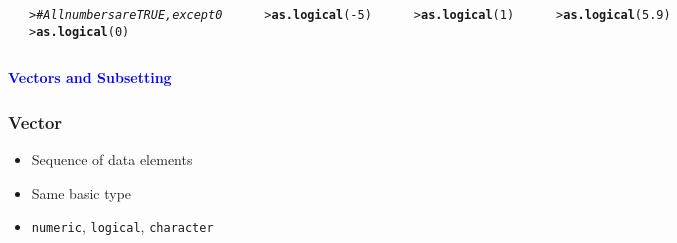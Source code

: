 \documentclass[13pt,aspectratio=169]{beamer}\usepackage[]{graphicx}\usepackage[]{color}
\makeatletter
\newcommand{\hlnum}[1]{\textcolor[rgb]{0.686,0.059,0.569}{#1}}%
\newcommand{\hlcom}[1]{\textcolor[rgb]{0.678,0.584,0.686}{\textit{#1}}}%
\newcommand{\hlopt}[1]{\textcolor[rgb]{0,0,0}{#1}}%
\newcommand{\hlstd}[1]{\textcolor[rgb]{0.345,0.345,0.345}{#1}}%
\newcommand{\hlkwd}[1]{\textcolor[rgb]{0.737,0.353,0.396}{\textbf{#1}}}%
\newenvironment{kframe}{%
 \def\at@end@of@kframe{}%
 \ifinner\ifhmode%
  \def\at@end@of@kframe{\end{minipage}}%
  \begin{minipage}{\columnwidth}%
 \fi\fi%
 \def\FrameCommand##1{\hskip\@totalleftmargin \hskip-\fboxsep
 \colorbox{shadecolor}{##1}\hskip-\fboxsep
     \hskip-\linewidth \hskip-\@totalleftmargin \hskip\columnwidth}%
 \MakeFramed {\advance\hsize-\width
   \@totalleftmargin\z@ \linewidth\hsize
   \@setminipage}}%
 {\par\unskip\endMakeFramed%
 \at@end@of@kframe}
\newenvironment{knitrout}{}{} %
\newcommand{\tc}[2]{\textcolor{#1}{#2}}
\renewcommand{\tt}[1]{\texttt{#1}}
\renewenvironment{knitrout}{\setlength{\topsep}{0mm}}{}
\makeatother
\begin{document}
\begin{frame}[fragile]
\begin{columns}[t]
\begin{knitrout}
\begin{kframe}
{\ttfamily\noindent\color{warningcolor}{Warning: NAs introduced by coercion}}\begin{verbatim}
[1] NA
\end{verbatim}
\end{kframe}
\end{knitrout}
\begin{knitrout}\small
{}\color{fgcolor}\begin{kframe}
\begin{alltt}
\hlstd{> }\hlcom{# All numbers are TRUE, except 0}
\hlstd{> }\hlkwd{as.logical}\hlstd{(}\hlnum{0}\hlstd{)}
\end{alltt}
\begin{verbatim}
[1] FALSE
\end{verbatim}
\begin{alltt}
\hlstd{> }\hlkwd{as.logical}\hlstd{(}\hlopt{-}\hlnum{5}\hlstd{)}
\end{alltt}
\begin{verbatim}
[1] TRUE
\end{verbatim}
\begin{alltt}
\hlstd{> }\hlkwd{as.logical}\hlstd{(}\hlnum{1}\hlstd{)}
\end{alltt}
\begin{verbatim}
[1] TRUE
\end{verbatim}
\begin{alltt}
\hlstd{> }\hlkwd{as.logical}\hlstd{(}\hlnum{5.9}\hlstd{)}
\end{alltt}
\begin{verbatim}
[1] TRUE
\end{verbatim}
\end{kframe}
\end{knitrout}
    \end{columns}
\end{frame}

\begin{frame}
    \begin{center}
	\textbf{\Huge{\tc{Blue}{Vectors and Subsetting}}}
    \end{center}
\end{frame}

\begin{frame}
    \frametitle{Vector}
    \begin{itemize}
	\item Sequence of data elements
	\item Same basic type
	\item \tt{numeric}, \tt{logical}, \tt{character}
    \end{itemize}
\end{frame}
\end{document}
